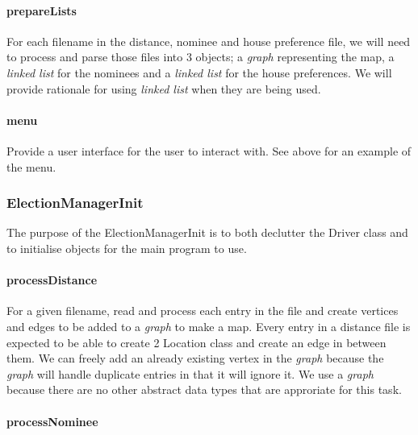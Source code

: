 \documentclass[a4paper, 12pt, titlepage]{article}
\begin{document}
\paragraph{prepareLists} \hspace{0pt}

For each filename in the distance, nominee and house preference file, we
will need to process and parse those files into 3 objects; a \textit{graph}
representing the map, a \textit{linked list} for the nominees and a
\textit{linked list} for the house preferences. We will provide rationale
for using \textit{linked list} when they are being used.

\paragraph{menu} \hspace{0pt}

Provide a user interface for the user to interact with. See above for
an example of the menu.

\newpage

\subsubsection{ElectionManagerInit}

The purpose of the ElectionManagerInit is to both declutter the Driver
class and to initialise objects for the main program to use.

\paragraph{processDistance} \hspace{0pt}

For a given filename, read and process each entry in the file
and create vertices and edges to be added to a \textit{graph} to make a map.
Every entry in a distance file is expected to be able to create 2
Location class and create an edge in between them. We can freely add
an already existing vertex in the \textit{graph} because the \textit{graph}
will handle duplicate entries in that it will ignore it. We use a
\textit{graph} because there are no other abstract data types that are
approriate for this task.

\paragraph{processNominee} \hspace{0pt}
\end{document}
